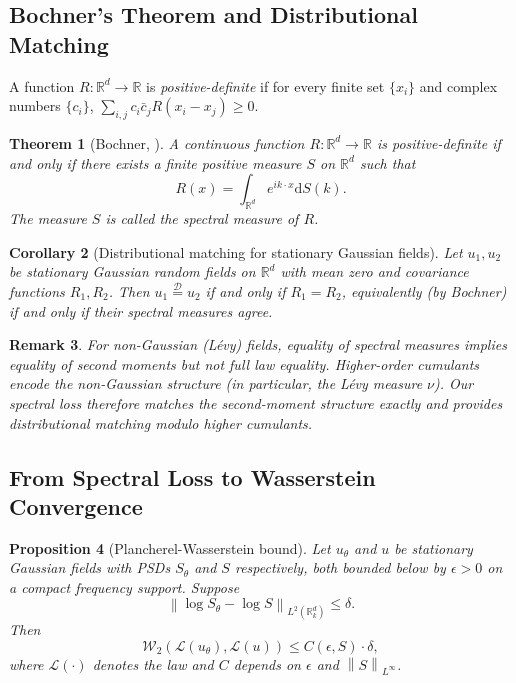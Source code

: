 \documentclass[times,12pt]{elsarticle}
\newcommand{\bbR}{\mathbb{R}}
\newcommand{\norm}[1]{\left\|#1\right\|}
\newcommand{\diff}{\mathrm{d}}
\newcommand{\Wasserstein}{\mathcal{W}_2}
\newtheorem{theorem}{Theorem}[section]
\newtheorem{proposition}[theorem]{Proposition}
\newtheorem{corollary}[theorem]{Corollary}
\newtheorem{remark}[theorem]{Remark}
\begin{document}

\subsection{Bochner's Theorem and Distributional Matching}

A function $R : \bbR^d \to \bbR$ is \emph{positive-definite} if for every finite set $\{x_i\}$ and complex numbers $\{c_i\}$, $\sum_{i,j} c_i \bar{c}_j R(x_i - x_j) \geq 0$.

\begin{theorem}[Bochner, \cite{Folland1995}]
\label{thm:bochner}
A continuous function $R : \bbR^d \to \bbR$ is positive-definite if and only if there exists a finite positive measure $S$ on $\bbR^d$ such that
\begin{equation}
R(x) = \int_{\bbR^d} e^{i k \cdot x} \diff S(k).
\end{equation}
The measure $S$ is called the \emph{spectral measure} of $R$.
\end{theorem}

\begin{corollary}[Distributional matching for stationary Gaussian fields]
\label{cor:gaussian-matching}
Let $u_1, u_2$ be stationary Gaussian random fields on $\bbR^d$ with mean zero and covariance functions $R_1, R_2$. Then $u_1 \stackrel{\mathcal{D}}{=} u_2$ if and only if $R_1 = R_2$, equivalently (by Bochner) if and only if their spectral measures agree.
\end{corollary}

\begin{remark}
For non-Gaussian (L\'evy) fields, equality of spectral measures implies equality of second moments but not full law equality. Higher-order cumulants encode the non-Gaussian structure (in particular, the L\'evy measure $\nu$). Our spectral loss therefore matches the second-moment structure exactly and provides distributional matching modulo higher cumulants.
\end{remark}

\subsection{From Spectral Loss to Wasserstein Convergence}

\begin{proposition}[Plancherel-Wasserstein bound]
\label{prop:wasserstein-bound}
Let $u_\theta$ and $u$ be stationary Gaussian fields with PSDs $S_\theta$ and $S$ respectively, both bounded below by $\epsilon > 0$ on a compact frequency support. Suppose
\begin{equation}
\norm{\log S_\theta - \log S}_{L^2(\bbR^d_k)} \leq \delta.
\end{equation}
Then
\begin{equation}
\Wasserstein(\mathcal{L}(u_\theta), \mathcal{L}(u)) \leq C(\epsilon, S) \cdot \delta,
\end{equation}
where $\mathcal{L}(\cdot)$ denotes the law and $C$ depends on $\epsilon$ and $\norm{S}_{L^\infty}$.
\end{proposition}
\end{document}
